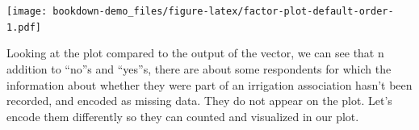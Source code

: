 \documentclass[]{book}
\newenvironment{Shaded}{\begin{snugshade}}{\end{snugshade}}
\newcommand{\KeywordTok}[1]{\textcolor[rgb]{0.13,0.29,0.53}{\textbf{#1}}}
\newcommand{\StringTok}[1]{\textcolor[rgb]{0.31,0.60,0.02}{#1}}
\newcommand{\OperatorTok}[1]{\textcolor[rgb]{0.81,0.36,0.00}{\textbf{#1}}}
\newcommand{\NormalTok}[1]{#1}
\begin{document}
\texttt{[image: bookdown-demo\_files/figure-latex/factor-plot-default-order-1.pdf]}

Looking at the plot compared to the output of the vector, we can see
that n addition to ``no''s and ``yes''s, there are about some
respondents for which the information about whether they were part of an
irrigation association hasn't been recorded, and encoded as missing
data. They do not appear on the plot. Let's encode them differently so
they can counted and visualized in our plot.

\begin{Shaded}
\end{Shaded}
\end{document}
